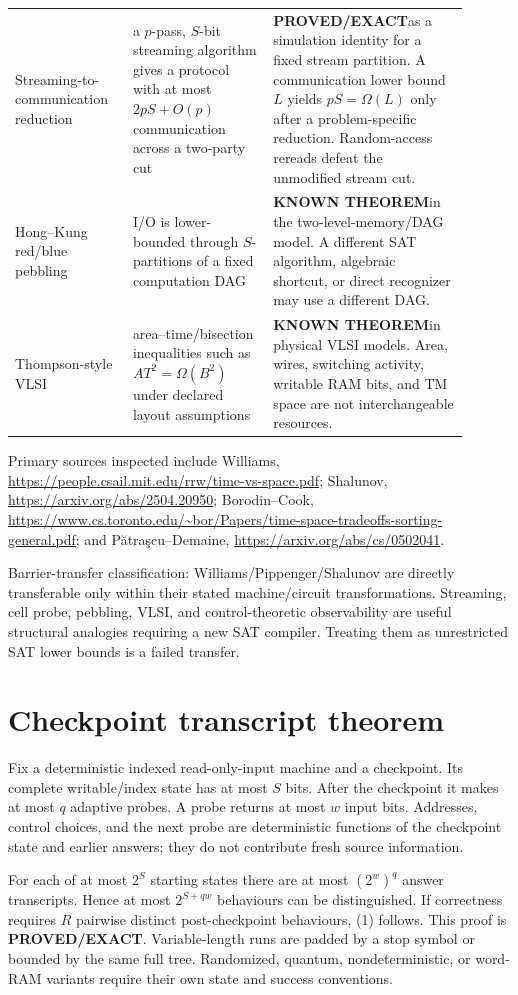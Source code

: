\documentclass[11pt]{article}
\newcommand{\proved}{\textbf{PROVED/EXACT}}
\newcommand{\known}{\textbf{KNOWN THEOREM}}
\begin{document}
\begin{longtable}{p{0.23\linewidth}p{0.28\linewidth}p{0.39\linewidth}}
Streaming-to-communication reduction &
a $p$-pass, $S$-bit streaming algorithm gives a protocol with at most $2pS+O(p)$
communication across a two-party cut &
\proved as a simulation identity for a fixed stream partition.  A communication
lower bound $L$ yields $pS=\Omega(L)$ only after a problem-specific reduction.
Random-access rereads defeat the unmodified stream cut.\\

Hong--Kung red/blue pebbling &
I/O is lower-bounded through $S$-partitions of a fixed computation DAG &
\known in the two-level-memory/DAG model.  A different SAT algorithm, algebraic
shortcut, or direct recognizer may use a different DAG.\\

Thompson-style VLSI &
area--time/bisection inequalities such as $AT^2=\Omega(B^2)$ under declared layout
assumptions &
\known in physical VLSI models.  Area, wires, switching activity, writable RAM bits,
and TM space are not interchangeable resources.\\
\bottomrule
\end{longtable}

Primary sources inspected include Williams,
\url{https://people.csail.mit.edu/rrw/time-vs-space.pdf}; Shalunov,
\url{https://arxiv.org/abs/2504.20950}; Borodin--Cook,
\url{https://www.cs.toronto.edu/~bor/Papers/time-space-tradeoffs-sorting-general.pdf};
and P\u{a}tra\c{s}cu--Demaine,
\url{https://arxiv.org/abs/cs/0502041}.

Barrier-transfer classification: Williams/Pippenger/Shalunov are directly
transferable only within their stated machine/circuit transformations.  Streaming,
cell probe, pebbling, VLSI, and control-theoretic observability are useful structural
analogies requiring a new SAT compiler.  Treating them as unrestricted SAT lower
bounds is a failed transfer.

\section*{Checkpoint transcript theorem}
Fix a deterministic indexed read-only-input machine and a checkpoint.  Its complete
writable/index state has at most $S$ bits.  After the checkpoint it makes at most $q$
adaptive probes.  A probe returns at most $w$ input bits.  Addresses, control choices,
and the next probe are deterministic functions of the checkpoint state and earlier
answers; they do not contribute fresh source information.

For each of at most $2^S$ starting states there are at most $(2^w)^q$ answer
transcripts.  Hence at most $2^{S+qw}$ behaviours can be distinguished.  If correctness
requires $R$ pairwise distinct post-checkpoint behaviours, (1) follows.  This proof is
\proved.  Variable-length runs are padded by a stop symbol or bounded by the same full
tree.  Randomized, quantum, nondeterministic, or word-RAM variants require their own
state and success conventions.
\end{document}
